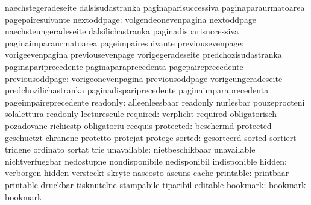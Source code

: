                            naechstegeradeseite       dalsisudastranka
                           paginaparisuccessiva      paginaparaurmatoarea
                           pagepairesuivante
              nextoddpage: volgendeonevenpagina      nextoddpage
                           naechsteungeradeseite     dalsilichastranka
                           paginadisparisuccessiva   paginaimparaurmatoarea
                           pageimpairesuivante
         previousevenpage: vorigeevenpagina          previousevenpage
                           vorigegeradeseite         predchozisudastranka
                           paginapariprecedente      paginaparaprecedenta
                           pagepaireprecedente
          previousoddpage: vorigeonevenpagina        previousoddpage
                           vorigeungeradeseite       predchozilichastranka
                           paginadispariprecedente   paginaimparaprecedenta
                           pageimpaireprecedente
                 readonly: alleenleesbaar            readonly
                           nurlesbar                 pouzeprocteni
                           solalettura               readonly
                           lectureseule
                 required: verplicht                 required
                           obligatorisch             pozadovane
                           richiestp                 obligatoriu
                           recquis
                protected: beschermd                 protected
                           geschuetzt                chranene
                           protetto                  protejat
                           protege
                   sorted: gesorteerd                sorted
                           sortiert                  tridene
                           ordinato                  sortat
                           trie
              unavailable: nietbeschikbaar           unavailable
                           nichtverfuegbar           nedostupne
                           nondisponibile            nedisponibil
                           indisponible
                   hidden: verborgen                 hidden
                           versteckt                 skryte
                           nascosto                  ascuns
                           cache
                printable: printbaar                 printable
                           druckbar                  tisknutelne
                           stampabile                tiparibil
                           editable
                 bookmark: bookmark                  bookmark
